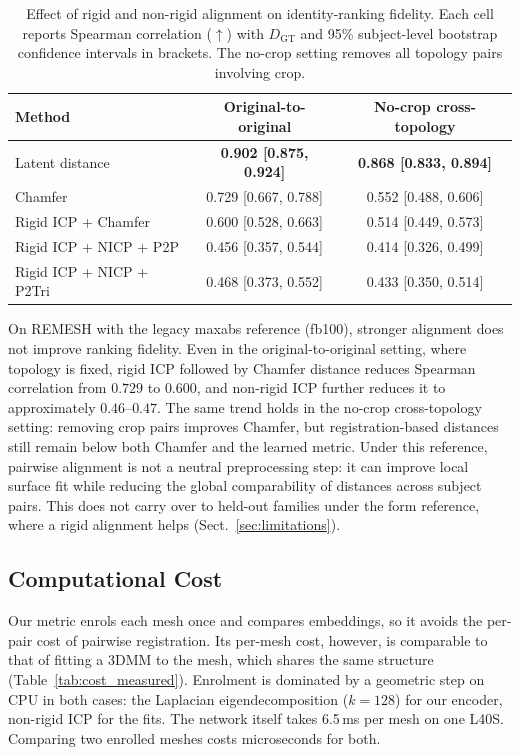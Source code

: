 \documentclass[10pt,twocolumn,letterpaper]{article}
\begin{document}
\begin{table}[!ht]
\centering
\small
\caption{Effect of rigid and non-rigid alignment on identity-ranking fidelity.
Each cell reports Spearman correlation ($\uparrow$) with $D_{\mathrm{GT}}$ and
95\% subject-level bootstrap confidence intervals in brackets. The no-crop
setting removes all topology pairs involving crop.}
\label{tab:alignment_effect}
\begin{tabular}{lcc}
\toprule
Method & Original-to-original & No-crop cross-topology \\
\midrule
Latent distance & \textbf{0.902 [0.875, 0.924]} & \textbf{0.868 [0.833, 0.894]} \\
Chamfer & 0.729 [0.667, 0.788] & 0.552 [0.488, 0.606] \\
Rigid ICP + Chamfer & 0.600 [0.528, 0.663] & 0.514 [0.449, 0.573] \\
Rigid ICP + NICP + P2P & 0.456 [0.357, 0.544] & 0.414 [0.326, 0.499] \\
Rigid ICP + NICP + P2Tri & 0.468 [0.373, 0.552] & 0.433 [0.350, 0.514] \\
\bottomrule
\end{tabular}
\end{table}

On REMESH with the legacy maxabs reference (fb100), stronger alignment does not improve ranking fidelity. Even in the original-to-original setting, where topology is fixed, rigid ICP followed by Chamfer distance reduces Spearman correlation from $0.729$ to $0.600$, and non-rigid ICP further reduces it to approximately $0.46$--$0.47$. The same trend holds in the no-crop cross-topology setting: removing crop pairs improves Chamfer, but registration-based distances still remain below both Chamfer and the learned metric. Under this reference, pairwise alignment is not a neutral preprocessing step: it can improve local surface fit while reducing the global comparability of distances across subject pairs. This does not carry over to held-out families under the form reference, where a rigid alignment helps (Sect.~\ref{sec:limitations}).

\subsection{Computational Cost}
\label{sec:computational_cost}
Our metric enrols each mesh once and compares embeddings, so it avoids the per-pair cost of pairwise registration. Its per-mesh cost, however, is comparable to that of fitting a 3DMM to the mesh, which shares the same structure (Table~\ref{tab:cost_measured}). Enrolment is dominated by a geometric step on CPU in both cases: the Laplacian eigendecomposition ($k=128$) for our encoder, non-rigid ICP for the fits. The network itself takes 6.5\,ms per mesh on one L40S. Comparing two enrolled meshes costs microseconds for both.
\end{document}
